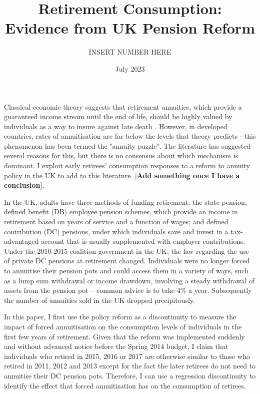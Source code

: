 \documentclass[12pt]{article}
\date{July 2023}
\title{Retirement Consumption: Evidence from UK Pension Reform}
\author{INSERT NUMBER HERE}
\begin{document}
\newpage
\maketitle
\tableofcontents
\newpage

Classical economic theory suggests that retirement annuities, which provide a
guaranteed income stream until the end of life, should be highly valued by
individuals as a way to insure against late death \cite{yaari_65}. However, in
developed countries, rates of annuitisation are far below the levels that theory
predicts - this phenomenon has been termed the "annuity puzzle". The literature
has suggested several reasons for this, but there is no consensus about which
mechanism is dominant. I exploit early retirees' consumption responses to a
reform to annuity policy in the UK to add to this literature. [\textbf{Add
            something once I have a conclusion}].

In the UK, adults have three methods of funding retirement: the state pension;
defined benefit (DB) employee pension schemes, which provide an income in
retirement based on years of service and a function of wages; and defined
contribution (DC) pensions, under which individuals save and invest in a
tax-advantaged account that is usually supplemented with employer contributions.
Under the 2010-2015 coalition government in the UK, the law regarding the use of
private DC pensions at retirement changed. Individuals were no longer forced to
annuitise their pension pots and could access them in a variety of ways, such as
a lump sum withdrawal or income drawdown, involving a steady withdrawal of
assets from the pension pot -- common advice is to take 4\% a year. Subsequently
the number of annuities sold in the UK dropped precipitously.

In this paper, I first use the policy reform as a discontinuity to measure the
impact of forced annuitisation on the consumption levels of individuals in the
first few years of retirement. Given that the reform was implemented suddenly
and without advanced notice before the Spring 2014 budget, I claim that
individuals who retired in 2015, 2016 or 2017 are otherwise similar to those who
retired in 2011, 2012 and 2013 except for the fact the later retirees do not
need to annuitise their DC pension pots. Therefore, I can use a regression
discontinuity to identify the effect that forced annuitisation has on the
consumption of retirees.
\end{document}
